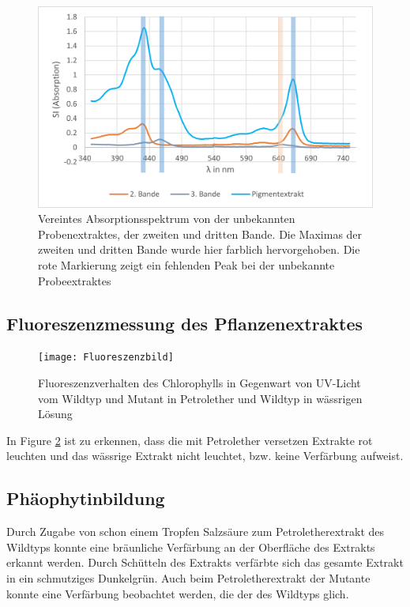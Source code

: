 \documentclass[10pt,a4paper]{article}
\begin{document}
			\begin{figure}[H]
				\centering
				\includegraphics[scale=0.5]{combinedwithcommonpeaks_Pigmentextrakt.png}
				\caption{Vereintes Absorptionsspektrum von der unbekannten Probenextraktes, der zweiten und dritten Bande. Die Maximas der zweiten und dritten Bande wurde hier farblich hervorgehoben. Die rote Markierung zeigt ein fehlenden Peak bei der unbekannte Probeextraktes}
				\label{fig:kombinierteabsorptionsspektrum}
			\end{figure}
			
		\subsection{Fluoreszenzmessung des Pflanzenextraktes}
		
			\begin{figure}[H]
				\centering
				\texttt{[image: Fluoreszenzbild]}
				\caption{Fluoreszenzverhalten des Chlorophylls in Gegenwart von UV-Licht vom Wildtyp und Mutant in Petrolether und Wildtyp in wässrigen Lösung}
				\label{fig:Fluoreszenzbild}
			\end{figure}
			
		In Figure \ref{fig:Fluoreszenzbild} ist zu erkennen, dass die mit Petrolether versetzen Extrakte rot leuchten und das wässrige Extrakt nicht leuchtet, bzw. keine Verfärbung aufweist. 
		
		\subsection{Phäophytinbildung}
			Durch Zugabe von schon einem Tropfen Salzsäure zum Petroletherextrakt des Wildtyps konnte eine bräunliche Verfärbung an der Oberfläche des Extrakts erkannt werden. Durch Schütteln des Extrakts verfärbte sich das gesamte Extrakt in ein schmutziges Dunkelgrün. Auch beim Petroletherextrakt der Mutante konnte eine Verfärbung beobachtet werden, die der des Wildtyps glich. \\
				
\end{document}

